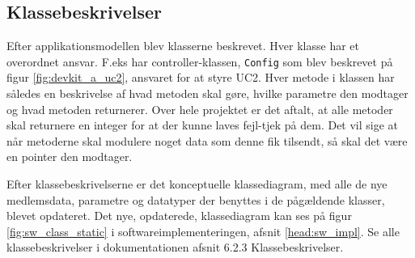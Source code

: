 \subsection{Klassebeskrivelser}

Efter applikationsmodellen blev klasserne beskrevet. Hver klasse har et overordnet ansvar. F.eks har controller-klassen, \verb+Config+ som blev beskrevet på figur \ref{fig:devkit_a_uc2}, ansvaret for at styre UC2. Hver metode i klassen har således en beskrivelse af hvad metoden skal gøre, hvilke parametre den modtager og hvad metoden returnerer. Over hele projektet er det aftalt, at alle metoder skal returnere en integer for at der kunne laves fejl-tjek på dem. Det vil sige at når metoderne skal modulere noget data som denne fik tilsendt, så skal det være en pointer den modtager.

Efter klassebeskrivelserne er det konceptuelle klassediagram, med alle de nye medlemsdata, parametre og datatyper der benyttes i de pågældende klasser, blevet opdateret. Det nye, opdaterede, klassediagram kan ses på figur \ref{fig:sw_class_static} i softwareimplementeringen, afsnit \ref{head:sw_impl}. Se alle klassebeskrivelser i dokumentationen afsnit 6.2.3 Klassebeskrivelser.

